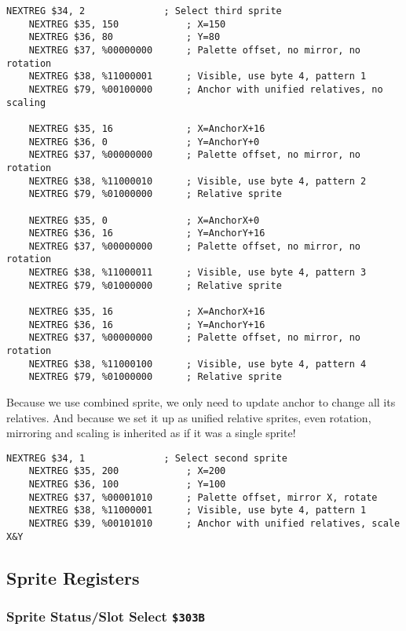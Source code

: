 \documentclass[12pt,twoside,openright,a4paper]{book}
\begin{document}
\begin{Verbatim}[gobble=1]
	NEXTREG $34, 2              ; Select third sprite
	NEXTREG $35, 150            ; X=150
	NEXTREG $36, 80             ; Y=80
	NEXTREG $37, %00000000      ; Palette offset, no mirror, no rotation
	NEXTREG $38, %11000001      ; Visible, use byte 4, pattern 1
	NEXTREG $79, %00100000      ; Anchor with unified relatives, no scaling

	NEXTREG $35, 16             ; X=AnchorX+16
	NEXTREG $36, 0              ; Y=AnchorY+0
	NEXTREG $37, %00000000      ; Palette offset, no mirror, no rotation
	NEXTREG $38, %11000010      ; Visible, use byte 4, pattern 2
	NEXTREG $79, %01000000      ; Relative sprite

	NEXTREG $35, 0              ; X=AnchorX+0
	NEXTREG $36, 16             ; Y=AnchorY+16
	NEXTREG $37, %00000000      ; Palette offset, no mirror, no rotation
	NEXTREG $38, %11000011      ; Visible, use byte 4, pattern 3
	NEXTREG $79, %01000000      ; Relative sprite

	NEXTREG $35, 16             ; X=AnchorX+16
	NEXTREG $36, 16             ; Y=AnchorY+16
	NEXTREG $37, %00000000      ; Palette offset, no mirror, no rotation
	NEXTREG $38, %11000100      ; Visible, use byte 4, pattern 4
	NEXTREG $79, %01000000      ; Relative sprite
\end{Verbatim}

Because we use combined sprite, we only need to update anchor to change all its relatives. And because we set it up as unified relative sprites, even rotation, mirroring and scaling is inherited as if it was a single sprite!

\begin{Verbatim}[gobble=1]
	NEXTREG $34, 1              ; Select second sprite
	NEXTREG $35, 200            ; X=200
	NEXTREG $36, 100            ; Y=100
	NEXTREG $37, %00001010      ; Palette offset, mirror X, rotate
	NEXTREG $38, %11000001      ; Visible, use byte 4, pattern 1
	NEXTREG $39, %00101010      ; Anchor with unified relatives, scale X&Y 
\end{Verbatim}


\pagebreak
\subsection{Sprite Registers}
\label{zx_next_sprite_registers}

\subsubsection{Sprite Status/Slot Select {\tt \$303B}}
\end{document}
